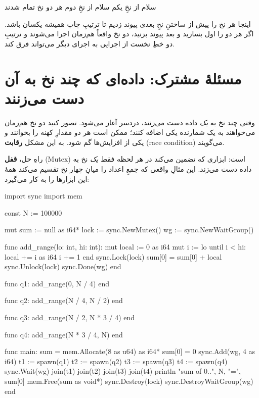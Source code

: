 \begin{progoutfa}
سلام از نخِ یکم
سلام از نخِ دوم
هر دو نخ تمام شدند
\end{progoutfa}

اینجا هر نخ را پیش از ساختنِ نخِ بعدی پیوند زدیم تا ترتیبِ چاپ همیشه یکسان
باشد. اگر هر دو را اول بسازید و بعد پیوند بزنید، دو نخ واقعاً هم‌زمان اجرا
می‌شوند و ترتیبِ دو خطِ نخست از اجرایی به اجرای دیگر می‌تواند فرق کند.

\section{مسئلهٔ مشترک: داده‌ای که چند نخ به آن دست می‌زنند}

وقتی چند نخ به \emph{یک} داده دست می‌زنند، دردسر آغاز می‌شود. تصور کنید دو نخ
هم‌زمان می‌خواهند به یک شمارنده یکی اضافه کنند؛ ممکن است هر دو مقدارِ کهنه را
بخوانند و یکی از افزایش‌ها گم شود. به این مشکل \textbf{رقابت} (race condition)
می‌گویند.

راهِ حل، \textbf{قفل} (Mutex) است: ابزاری که تضمین می‌کند در هر لحظه فقط
\emph{یک} نخ به داده دست می‌زند. این مثالِ واقعی که جمعِ اعداد را میانِ
چهار نخ تقسیم می‌کند همهٔ این ابزارها را به کار می‌گیرد:

\begin{salamen}
import sync
import mem

const N := 100000

mut sum := null as i64*
lock := sync.NewMutex()
wg := sync.NewWaitGroup()

func add_range(lo: int, hi: int):
    mut local := 0 as i64
    mut i := lo
    until i < hi:
        local += i as i64
        i += 1
    end
    sync.Lock(lock)
    sum[0] = sum[0] + local
    sync.Unlock(lock)
    sync.Done(wg)
end

func q1: add_range(0, N / 4) end

func q2: add_range(N / 4, N / 2) end

func q3: add_range(N / 2, N * 3 / 4) end

func q4: add_range(N * 3 / 4, N) end

func main:
    sum = mem.Allocate(8 as u64) as i64*
    sum[0] = 0
    sync.Add(wg, 4 as i64)
    t1 := spawn(q1)
    t2 := spawn(q2)
    t3 := spawn(q3)
    t4 := spawn(q4)
    sync.Wait(wg)
    join(t1)
    join(t2)
    join(t3)
    join(t4)
    println "sum of 0..", N, "=", sum[0]
    mem.Free(sum as void*)
    sync.Destroy(lock)
    sync.DestroyWaitGroup(wg)
end
\end{salamen}

